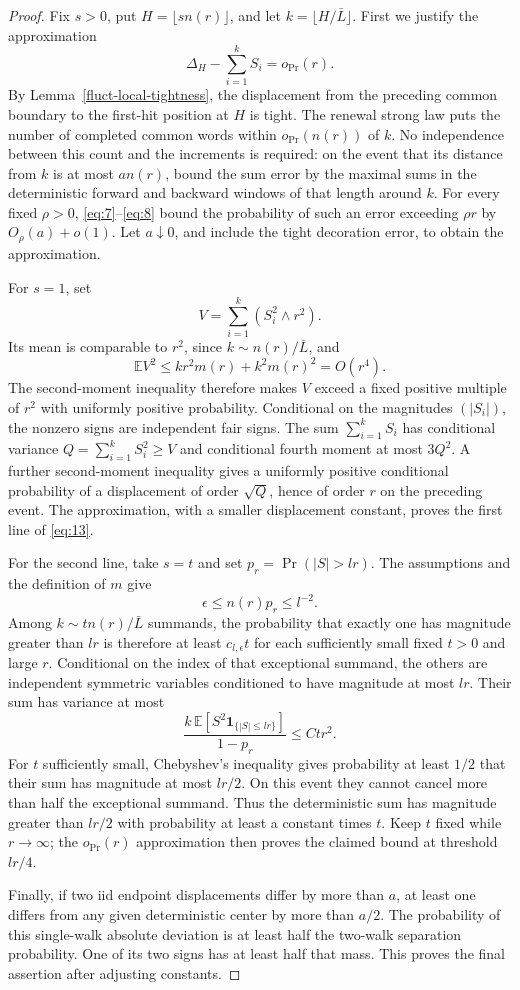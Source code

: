 \begin{proof}
Fix \(s>0\), put \(H=\lfloor sn(r)\rfloor\), and let
\(k=\lfloor H/\bar L\rfloor\). First we justify the approximation
\[
\Delta_H-\sum_{i=1}^kS_i=o_{\Pr}(r).
\]
By Lemma~\ref{fluct-local-tightness}, the displacement from the
preceding common boundary to the first-hit position at \(H\) is
tight. The renewal strong law puts the number of completed common
words within \(o_{\Pr}(n(r))\) of \(k\). No independence between
this count and the increments is required: on the event that its
distance from \(k\) is at most \(an(r)\), bound the sum error by
the maximal sums in the deterministic forward and backward
windows of that length around \(k\). For every fixed
\(\rho>0\), \eqref{eq:7}--\eqref{eq:8} bound the probability of
such an error exceeding \(\rho r\) by
\(O_\rho(a)+o(1)\). Let \(a\downarrow0\), and include the tight
decoration error, to obtain the approximation.

For \(s=1\), set
\[
V=\sum_{i=1}^k(S_i^2\wedge r^2).
\]
Its mean is comparable to \(r^2\), since
\(k\sim n(r)/\bar L\), and
\[
\mathbb E V^2
 \le kr^2m(r)+k^2m(r)^2=O(r^4).
\]
The second-moment inequality therefore makes \(V\) exceed a fixed
positive multiple of \(r^2\) with uniformly positive probability.
Conditional on the magnitudes \((|S_i|)\), the nonzero signs are
independent fair signs. The sum \(\sum_{i=1}^kS_i\) has conditional
variance \(Q=\sum_{i=1}^kS_i^2\ge V\) and conditional fourth
moment at most \(3Q^2\). A further second-moment inequality gives
a uniformly positive conditional probability of a displacement
of order \(\sqrt Q\), hence of order \(r\) on the preceding event.
The approximation, with a smaller displacement constant, proves
the first line of \eqref{eq:13}.

For the second line, take \(s=t\) and set
\(p_r=\Pr(|S|>lr)\). The assumptions and the definition of \(m\)
give
\[
\epsilon\le n(r)p_r\le l^{-2}.
\]
Among \(k\sim tn(r)/\bar L\) summands, the probability that exactly
one has magnitude greater than \(lr\) is therefore at least
\(c_{l,\epsilon}t\) for each sufficiently small fixed \(t>0\) and
large \(r\). Conditional on the index of that exceptional
summand, the others are independent symmetric variables
conditioned to have magnitude at most \(lr\). Their sum has
variance at most
\[
\frac{k\,\mathbb E[S^2\mathbf1_{\{|S|\le lr\}}]}{1-p_r}
 \le Ctr^2.
\]
For \(t\) sufficiently small, Chebyshev's inequality gives
probability at least \(1/2\) that their sum has magnitude at most
\(lr/2\). On this event they cannot cancel more than half the
exceptional summand. Thus the deterministic sum has magnitude
greater than \(lr/2\) with probability at least a constant times
\(t\). Keep \(t\) fixed while \(r\to\infty\); the
\(o_{\Pr}(r)\) approximation then proves the claimed bound at
threshold \(lr/4\).

Finally, if two iid endpoint displacements differ by more than
\(a\), at least one differs from any given deterministic center
by more than \(a/2\). The probability of this single-walk
absolute deviation is at least half the two-walk separation
probability. One of its two signs has at least half that mass.
This proves the final assertion after adjusting constants.
\end{proof}
